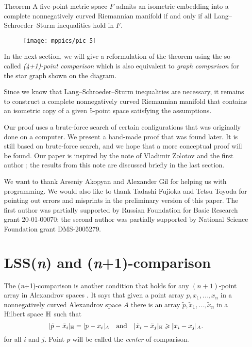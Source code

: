 \documentclass{article}
\begin{document}
\begin{thm}{Theorem}\label{thm:main}
A five-point metric space $F$ admits an isometric embedding into a complete nonnegatively curved Riemannian manifold
if and only if all Lang--Schroeder--Sturm inequalities hold in $F$.
\end{thm}

\begin{wrapfigure}{r}{15mm}
\vskip-0mm
\centering
\texttt{[image: mppics/pic-5]}
\end{wrapfigure}

In the next section, we will give a reformulation of the theorem using the so-called \emph{(4+1)-point comparison} \cite{alexander2019alexandrov,AKP-Kirszbraun} which is also equivalent to \emph{graph comparison} \cite{lebedeva-petrunin-zolotov} for the star graph shown on the diagram.

Since we know that Lang--Schroeder--Sturm inequalities are necessary,
it remains to construct a complete nonnegatively curved Riemannian manifold that contains an isometric copy of a given 5-point space satisfying the assumptions.

Our proof uses a brute-force search of certain configurations that was originally done on a computer.
We present a hand-made proof that was found later.
It is still based on brute-force search, and we hope that a more conceptual proof will be found.
Our paper is inspired by the note of Vladimir Zolotov and the first author \cite{lebedeva-zolotov};
the results from this note are discussed briefly in the last section.

We want to thank Arseniy Akopyan and Alexander Gil for helping us with programming.
We would also like to thank Tadashi Fujioka and Tetsu Toyoda for pointing out errors and misprints in the preliminary version of this paper.
The first author was partially supported by Russian Foundation for Basic Research grant 20-01-00070; 
the second author was partially supported by National Science Foundation grant DMS-2005279.

\section{LSS(\textit{n}) and (\textit{n}+1)-comparison}


The (\textit{n}+1)-comparison is another condition that holds for any $(n+1)$-point array in  Alexandrov spaces \cite{alexander2019alexandrov,AKP-Kirszbraun}.
It says that given a point array $p,x_1,\dots,x_n$ in a nonnegatively curved Alexandrov space $A$ 
there is an array $\tilde p,\tilde x_1,\dots,\tilde x_n$ in a Hilbert space $\mathbb H$ such that 
\[
|\tilde p-\tilde x_i|_{\mathbb H}=|p-x_i|_{A}
\quad
\text{and}
\quad
|\tilde x_i-\tilde x_j|_{\mathbb H}\geqslant |x_i-x_j|_{A}.
\]
for all $i$ and $j$.
Point $p$ will be called the \emph{center} of comparison.
\end{document}
